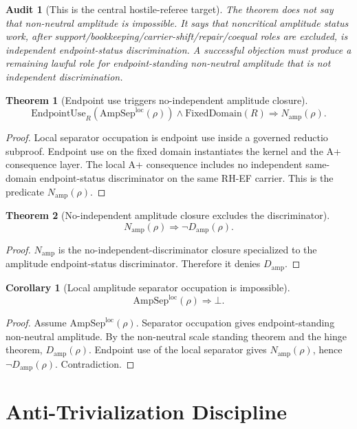 \documentclass[11pt]{article}
\newtheorem{theorem}{Theorem}[section]
\newtheorem{corollary}{Corollary}[section]
\newtheorem{audit}{Audit}[section]
\newcommand{\EndpointUse}{\mathrm{EndpointUse}}
\newcommand{\FixedDomain}{\mathrm{FixedDomain}}
\newcommand{\AmpSepLoc}{\mathrm{AmpSep}^{\mathrm{loc}}}
\newcommand{\Damp}{D_{\mathrm{amp}}}
\newcommand{\Namp}{N_{\mathrm{amp}}}
\begin{document}
\begin{audit}[This is the central hostile-referee target]
The theorem does not say that non-neutral amplitude is impossible.  It says that noncritical amplitude \emph{status work}, after support/bookkeeping/carrier-shift/repair/coequal roles are excluded, is independent endpoint-status discrimination.  A successful objection must produce a remaining lawful role for endpoint-standing non-neutral amplitude that is not independent discrimination.
\end{audit}

\begin{theorem}[Endpoint use triggers no-independent amplitude closure]
\[
\EndpointUse_R(\AmpSepLoc(\rho))\wedge \FixedDomain(R)
\Rightarrow \Namp(\rho).
\]
\end{theorem}

\begin{proof}
Local separator occupation is endpoint use inside a governed reductio subproof.  Endpoint use on the fixed domain instantiates the kernel and the A+ consequence layer.  The local A+ consequence includes no independent same-domain endpoint-status discriminator on the same RH-EF carrier.  This is the predicate \(\Namp(\rho)\).
\end{proof}

\begin{theorem}[No-independent amplitude closure excludes the discriminator]
\[
\Namp(\rho)\Rightarrow \neg\Damp(\rho).
\]
\end{theorem}

\begin{proof}
\(\Namp\) is the no-independent-discriminator closure specialized to the amplitude endpoint-status discriminator.  Therefore it denies \(\Damp\).
\end{proof}

\begin{corollary}[Local amplitude separator occupation is impossible]
\[
\AmpSepLoc(\rho)\Rightarrow \bot.
\]
\end{corollary}

\begin{proof}
Assume \(\AmpSepLoc(\rho)\).  Separator occupation gives endpoint-standing non-neutral amplitude.  By the non-neutral scale standing theorem and the hinge theorem, \(\Damp(\rho)\).  Endpoint use of the local separator gives \(\Namp(\rho)\), hence \(\neg\Damp(\rho)\).  Contradiction.
\end{proof}

\section{Anti-Trivialization Discipline}
\end{document}
